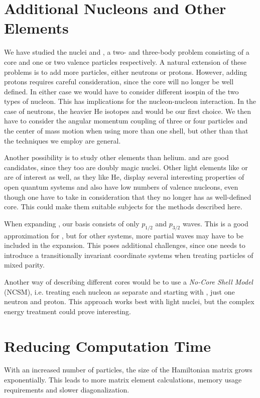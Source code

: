 \documentclass[../main/report.tex]{subfiles}
\begin{document}
\section{Additional Nucleons and Other Elements}

We have studied the nuclei  and , a two- and three-body problem consisting of a core and one or two valence particles respectively.
A natural extension of these problems is to add more particles, either neutrons or protons. However, adding protons requires careful consideration, since the core will no longer be well defined. 
In either case we would have to consider different isospin of the two types of nucleon.
This has implications for the nucleon-nucleon interaction.
In the case of neutrons, the heavier He isotopes  and  would be our first choice.
We then have to consider the angular momentum coupling of three or four particles and the center of mass motion when using more than one shell, but other than that the techniques we employ are general.

Another possibility is to study other elements than helium.  and  are good candidates, since they too are doubly magic nuclei.
Other light elements like  or  are of interest as well, as they like He, display several interesting properties of open quantum systems and also have low numbers of valence nucleons, even though one have to take in consideration that they no longer has as well-defined core. 
This could make them suitable subjects for the methods described here.

When expanding , our basis consists of only $p_{1/2}$ and $p_{3/2}$ waves. 
This is a good approximation for  \cite{gamow_shell_model_2008},  but for other systems, more partial waves may have to be included in the expansion.
This poses additional challenges, since one needs to introduce a transitionally invariant coordinate systems when treating particles of mixed parity. 

Another way of describing different cores would be to use a \emph{No-Core Shell Model} (NCSM), i.e. treating each nucleon as separate and starting with , just one neutron and proton. 
This approach works best with light nuclei, but the complex energy treatment could prove interesting.

\section{Reducing Computation Time}
With an increased number of particles, the size of the Hamiltonian matrix grows exponentially. This leads to more matrix element calculations, memory usage requirements and slower diagonalization.
\end{document}
